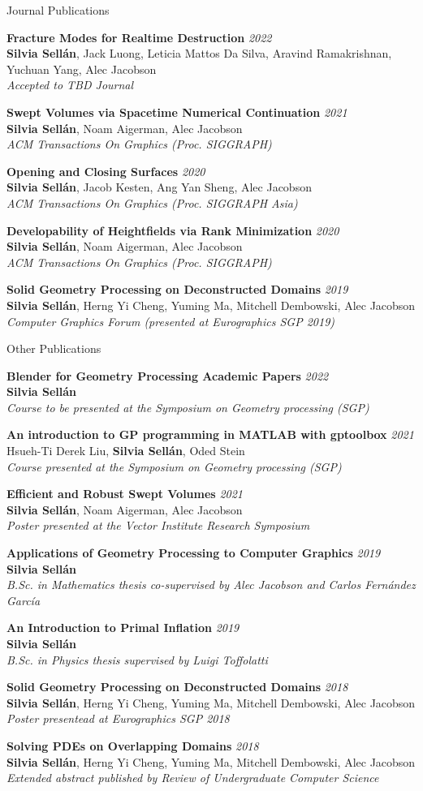 \documentclass{resume}
\newcommand{\publication}[5]{
    {\bf #1} \hfill {\em \small #2} \\ %
    {\small#3}{\small \bf Silvia Sell\'{a}n}{\small #4} \\ %
    {\small \it #5} %
}
\begin{document}
\begin{rSection}{Journal Publications}


\publication{Fracture Modes for Realtime Destruction}{2022}{}{, Jack Luong, Leticia Mattos Da Silva, Aravind Ramakrishnan, Yuchuan Yang, Alec Jacobson}{Accepted to TBD Journal}

\publication{Swept Volumes via Spacetime Numerical Continuation}{2021}{}{, Noam Aigerman, Alec Jacobson}{ACM Transactions On Graphics (Proc. SIGGRAPH)}

\publication{Opening and Closing Surfaces}{2020}{}{, Jacob Kesten, Ang Yan Sheng, Alec Jacobson}{ACM Transactions On Graphics (Proc. SIGGRAPH Asia)}

\publication{Developability of Heightfields via Rank Minimization}{2020}{}{, Noam Aigerman, Alec Jacobson}{ACM Transactions On Graphics (Proc. SIGGRAPH)}

\publication{Solid Geometry Processing on Deconstructed Domains}{2019}{}{, Herng Yi Cheng, Yuming Ma, Mitchell Dembowski, Alec Jacobson}{Computer Graphics Forum (presented at Eurographics SGP 2019)}
\end{rSection}

\begin{rSection}{Other Publications}

\publication{Blender for Geometry Processing Academic Papers}{2022}{}{}{Course to be presented at the Symposium on Geometry processing (SGP)}



\publication{An introduction to GP programming in MATLAB with gptoolbox}{2021}{ 
Hsueh-Ti Derek Liu, }{, Oded Stein}{Course presented at the Symposium on Geometry processing (SGP)}

\publication{Efficient and Robust Swept Volumes}{2021}{}{, Noam Aigerman, Alec Jacobson}{Poster presented at the Vector Institute Research Symposium}

\publication{Applications of Geometry Processing to Computer Graphics}{2019}{}{}{B.Sc. in Mathematics thesis co-supervised by Alec Jacobson and Carlos Fernández García}

\publication{An Introduction to Primal Inflation}{2019}{}{}{B.Sc. in Physics thesis supervised by Luigi Toffolatti}

\publication{Solid Geometry Processing on Deconstructed Domains}{2018}{}{, Herng Yi Cheng, Yuming Ma, Mitchell Dembowski, Alec Jacobson}
{Poster presentead at Eurographics SGP 2018}

\publication{Solving PDEs on Overlapping Domains}{2018}{}{, Herng Yi Cheng, Yuming Ma, Mitchell Dembowski, Alec Jacobson}{Extended abstract published by Review of Undergraduate Computer Science}

\end{rSection}
\end{document}
